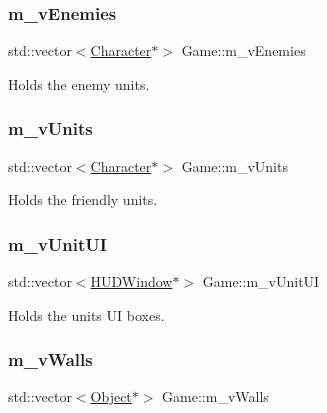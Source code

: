 \subsubsection{\texorpdfstring{m\+\_\+v\+Enemies}{m\_vEnemies}}
{\footnotesize\ttfamily std\+::vector$<$\hyperlink{class_character}{Character}$\ast$$>$ Game\+::m\+\_\+v\+Enemies\hspace{0.3cm}{\ttfamily [private]}}



Holds the enemy units. 

\mbox{\label{class_game_aec7246808449949b669badf29d72d046}} 
\subsubsection{\texorpdfstring{m\+\_\+v\+Units}{m\_vUnits}}
{\footnotesize\ttfamily std\+::vector$<$\hyperlink{class_character}{Character}$\ast$$>$ Game\+::m\+\_\+v\+Units\hspace{0.3cm}{\ttfamily [private]}}



Holds the friendly units. 

\mbox{\label{class_game_ad86fdba05346c76590c923f9e6faeaa3}} 
\subsubsection{\texorpdfstring{m\+\_\+v\+Unit\+UI}{m\_vUnitUI}}
{\footnotesize\ttfamily std\+::vector$<$\hyperlink{class_h_u_d_window}{H\+U\+D\+Window}$\ast$$>$ Game\+::m\+\_\+v\+Unit\+UI\hspace{0.3cm}{\ttfamily [private]}}



Holds the units UI boxes. 

\mbox{\label{class_game_a8110aa194807a60497845a58c45cf61c}} 
\subsubsection{\texorpdfstring{m\+\_\+v\+Walls}{m\_vWalls}}
{\footnotesize\ttfamily std\+::vector$<$\hyperlink{class_object}{Object}$\ast$$>$ Game\+::m\+\_\+v\+Walls\hspace{0.3cm}{\ttfamily [private]}}



